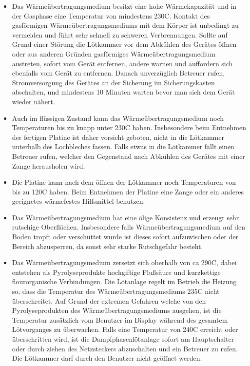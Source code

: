 \documentclass{\basedir/fablab-document}
\begin{document}
	\begin{itemize}
	\item Das W{\"a}rme{\"u}bertragungsmedium besitzt eine hohe W{\"a}rmekapazit{\"a}t und in der Gasphase eine Temperatur von mindestens 230\textdegree C. Kontakt des gasf{\"o}rmigen W{\"a}rme{\"u}bertragungsmediums mit dem K{\"o}rper ist unbedingt zu vermeiden und f{\"u}hrt sehr schnell zu schweren Verbrennungen. Sollte auf Grund einer St{\"o}rung die L{\"o}tkammer vor dem Abk{\"u}hlen des Ger{\"a}tes {\"o}ffnen oder aus anderen Gr{\"u}nden gasf{\"o}rmiges W{\"a}rme{\"u}bertragungsmedium austreten, sofort vom Ger{\"a}t entfernen, andere warnen und auffordern sich ebenfalls vom Ger{\"a}t zu entfernen. Danach unverz{\"u}glich Betreuer rufen, Stromversorgung des Ger{\"a}tes an der Sicherung im Sicherungskasten abschalten, und mindestens 10 Minuten warten bevor man sich dem Ger{\"a}t wieder n{\"a}hert.
	\item Auch im fl{\"u}ssigen Zustand kann das W{\"a}rme{\"u}bertragungsmedium noch Temperaturen bis zu knapp unter 230\textdegree C haben. Insbesondere beim Entnehmen der fertigen Platine ist daher vorsicht geboten, nicht in die L{\"o}tkammer unterhalb des Lochbleches fassen. Falls etwas in die L{\"o}tkammer f{\"a}llt einen Betreuer rufen, welcher den Gegenstand nach Abk{\"u}hlen des Ger{\"a}tes mit einer Zange herausholen wird.
	\item Die Platine kann nach dem {\"o}ffnen der L{\"o}tkammer noch Temperaturen von bis zu 120\textdegree C haben. Beim Entnehmen der Platine eine Zange oder ein anderes geeignetes w{\"a}rmefestes Hilfsmittel benutzen.
	\item Das W{\"a}rme{\"u}bertragungsmedium hat eine {\"o}lige Konsistenz und erzeugt sehr rutschige Oberfl{\"a}chen. Insbesondere falls W{\"a}rme{\"u}bertragungsmedium auf den Boden tropft oder versch{\"u}ttet wurde ist dieses sofort aufzuwischen oder der Bereich abzusperren, da sonst sehr starke Rutschgefahr besteht.
	\item Das W{\"a}rme{\"u}bertragungsmedium zersetzt sich oberhalb von ca 290\textdegree C, dabei entstehen als Pyrolyseprodukte hochgiftige Flu{\ss}s{\"a}ure und kurzkettige flourorganische Verbindungen. Die L{\"o}tanlage regelt im Betrieb die Heizung so, dass die Temperatur des W{\"a}rme{\"u}bertragungsmediums 235C nicht {\"u}berschreitet. Auf Grund der extremen Gefahren welche von den Pyrolyseprodukten des W{\"a}rme{\"u}bertragungsmediums ausgehen, ist die Temperatur zus{\"a}tzlich vom Benutzer im Display w{\"a}hrend des gesamtem L{\"o}tvorganges zu {\"u}berwachen. Falls eine Temperatur von 240\textdegree C erreicht oder {\"u}berschritten wird, ist die Dampfphasenl{\"o}tanlage sofort am Hauptschalter oder durch ziehen des Netzsteckers abzuschalten und ein Betreuer zu rufen. Die L{\"o}tkammer darf durch den Benutzer nicht ge{\"o}ffnet werden.

\end{itemize}
\end{document}

